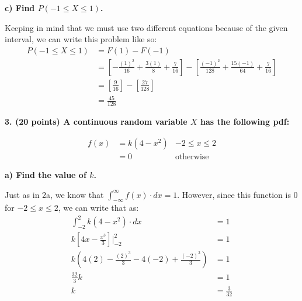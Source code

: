 \documentclass[12pt, letter]{article}
\begin{document}
\qquad \textbf{c) Find $P(-1 \le X \le 1)$.}
\begin{center}
	Keeping in mind that we must use two different equations because of the given interval, we can write this problem like so:
	\begin{align*}
		P(-1 \le X \le 1) &= F(1)-F(-1) \\
		&= \left[-\frac{(1)^{2}}{16} + \frac{3(1)}{8} + \frac{7}{16}\right] - \left[\frac{(-1)^{2}}{128} + \frac{15(-1)}{64} + \frac{7}{16}\right] \\
		&= \left[\frac{9}{16}\right] - \left[\frac{27}{128}\right] \\
		&= \boxed{\frac{45}{128}}
	\end{align*}
\end{center}

\textbf{3. (20 points) A continuous random variable $X$ has the following pdf:}
\begin{center}
	\begin{align*}
		f(x) &= k(4-x^{2}) & -2 \le x \le 2 \\
		&=0 & \text{otherwise}
	\end{align*}
\end{center}

\qquad \textbf{a) Find the value of $k$.}
\begin{center}
	Just as in 2a, we know that $\int_{-\infty}^{\infty} f(x) \cdot dx = 1$. However, since this function is $0$ for $-2 \le x \le 2$, we can write that as:
	\begin{align*}
		\int_{-2}^{2} k(4 - x^{2}) \cdot dx &= 1 \\
		k \left[4x - \frac{x^{3}}{3}\right] \Bigg|_{-2}^{2} &= 1 \\
		k\left(4(2) - \frac{(2)^{3}}{3} - 4(-2) + \frac{(-2)^{3}}{3}\right) &= 1 \\
		\frac{32}{3}k &= 1 \\
		k &= \boxed{\frac{3}{32}}
	\end{align*}
\end{center}
\end{document}
